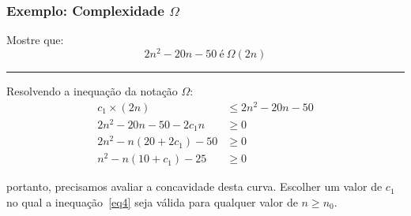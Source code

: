 \documentclass[10pt]{beamer}
\begin{document}
\begin{frame}[t]
    \frametitle{Exemplo: Complexidade $\Omega$}

    Mostre que: $$2n^2 -20n -50\ \text{é}\ \Omega(2n)$$
    \vfill
    \hrule
    \vfill
    Resolvendo a inequação da notação $\Omega$:
    \begin{align}
        c_1\times (2n)          & \leq 2n^2 - 20n - 50 \\
        2n^2 - 20n - 50 - 2c_1n & \geq 0               \\
        2n^2 - n(20+2c_1) - 50  & \geq 0               \\
        n^2 - n(10+c_1) - 25    & \geq 0\label{eq4}
    \end{align}

    portanto, precisamos avaliar a concavidade desta curva. Escolher um valor de $c_1$ no qual a inequação~\ref{eq4} seja válida para qualquer valor de $n\geq n_0$.
\end{frame}
\end{document}
